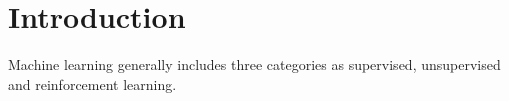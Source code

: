\section{Introduction}

Machine learning generally includes three categories as supervised, unsupervised and reinforcement learning. 
